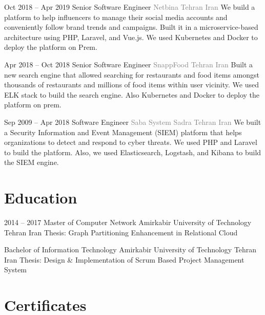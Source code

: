 \documentclass[14pt, a4paper, sans]{moderncv}
\begin{document}
    \cventry
    {Oct 2018 -- Apr 2019}
    {Senior Software Engineer}
    {\newline \textcolor{gray}{Netbina}}
    {\textcolor{gray}{Tehran}}
    {\textcolor{gray}{Iran}}
    {
        \fontsize{13}{16}\selectfont
        We build a platform to help influencers to manage their social media accounts and conveniently follow brand trends and campaigns.
        Built it in a microservice-based architecture using PHP, Laravel, and Vue.js.
        We used Kubernetes and Docker to deploy the platform on Prem.
    }

    \cventry
    {Apr 2018 -- Oct 2018}
    {Senior Software Engineer}
    {\newline \textcolor{gray}{SnappFood}}
    {\textcolor{gray}{Tehran}}
    {\textcolor{gray}{Iran}}
    {
        \fontsize{13}{16}\selectfont
        Built a new search engine that allowed searching for restaurants and food items amongst thousands of restaurants and millions of food items within user vicinity.
        We used ELK stack to build the search engine.
        Also Kubernetes and Docker to deploy the platform on prem.
    }

    \cventry
    {Sep 2009 -- Apr 2018}
    {Software Engineer}
    {\newline \textcolor{gray}{Saba System Sadra}}
    {\textcolor{gray}{Tehran}}
    {\textcolor{gray}{Iran}}
    {
        \fontsize{13}{16}\selectfont
        We built a Security Information and Event Management (SIEM) platform that helps organizations to detect and respond to cyber threats.
        We used PHP and Laravel to build the platform.
        Also, we used Elasticsearch, Logstash, and Kibana to build the SIEM engine.
    }


    \section{Education}\label{sec:education}

    \cventry
    {2014 -- 2017}
    {Master of Computer Network}
    {Amirkabir University of Technology}
    {Tehran}
    {Iran}
    {Thesis: Graph Partitioning Enhancement in Relational Cloud}

    {Bachelor of Information Technology}
    {Amirkabir University of Technology}
    {Tehran}
    {Iran}
    {Thesis: Design \& Implementation of Scrum Based Project Management System}


    \section{Certificates}\label{sec:certificates}
\end{document}
